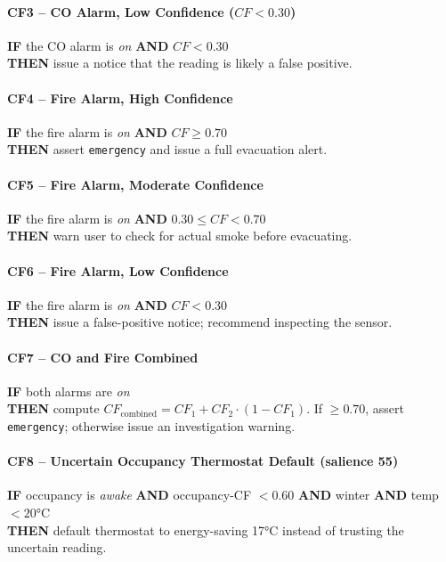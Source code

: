 \documentclass{article}
\begin{document}
\paragraph{CF3 -- CO Alarm, Low Confidence ($CF < 0.30$)}
\textbf{IF} the CO alarm is \emph{on} \textbf{AND} $CF < 0.30$ \\
\textbf{THEN} issue a notice that the reading is likely a false positive.

\paragraph{CF4 -- Fire Alarm, High Confidence}
\textbf{IF} the fire alarm is \emph{on} \textbf{AND} $CF \geq 0.70$ \\
\textbf{THEN} assert \texttt{emergency} and issue a full evacuation alert.

\paragraph{CF5 -- Fire Alarm, Moderate Confidence}
\textbf{IF} the fire alarm is \emph{on} \textbf{AND} $0.30 \leq CF < 0.70$ \\
\textbf{THEN} warn user to check for actual smoke before evacuating.

\paragraph{CF6 -- Fire Alarm, Low Confidence}
\textbf{IF} the fire alarm is \emph{on} \textbf{AND} $CF < 0.30$ \\
\textbf{THEN} issue a false-positive notice; recommend inspecting the sensor.

\paragraph{CF7 -- CO and Fire Combined}
\textbf{IF} both alarms are \emph{on} \\
\textbf{THEN} compute $CF_{\text{combined}} = CF_1 + CF_2 \cdot (1 - CF_1)$. If $\geq 0.70$, assert \texttt{emergency}; otherwise issue an investigation warning.

\paragraph{CF8 -- Uncertain Occupancy Thermostat Default (salience 55)}
\textbf{IF} occupancy is \emph{awake} \textbf{AND} occupancy-CF $< 0.60$ \textbf{AND} winter \textbf{AND} temp $< 20$°C \\
\textbf{THEN} default thermostat to energy-saving 17°C instead of trusting the uncertain reading.
\end{document}
